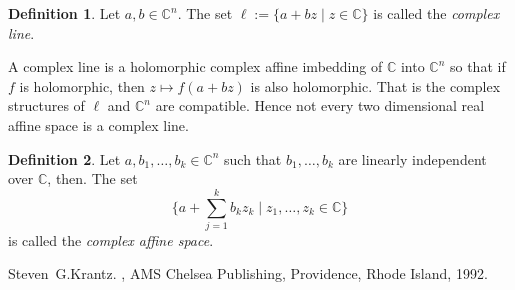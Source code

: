 \documentclass[12pt]{article}
\theoremstyle{theorem}
\theoremstyle{definition}
\newtheorem*{defn}{Definition}
\begin{document}
\begin{defn}
Let $a, b \in {\mathbb{C}}^n$.  The set
$\ell := \{a + b z \mid z \in {\mathbb{C}} \}$ is called the {\em complex line}.
\end{defn}

A complex line is a holomorphic complex affine imbedding of ${\mathbb{C}}$
into ${\mathbb{C}}^n$ so that if $f$ is holomorphic, then
$z \mapsto f(a + b z)$ is also holomorphic.  That is the complex structures of $\ell$ and ${\mathbb{C}}^n$ are compatible.  Hence not every two dimensional real affine space is a complex line.

\begin{defn}
Let $a, b_1, \ldots, b_k \in {\mathbb{C}}^n$ such that
$b_1, \ldots, b_k$ are linearly independent 
over ${\mathbb{C}}$,
then.  The set
\begin{equation*}
\{a + \sum_{j=1}^k b_k z_k \mid z_1,\ldots,z_k \in {\mathbb{C}} \}
\end{equation*}
is called the {\em complex affine space}.
\end{defn}

\begin{thebibliography}{9}
Steven~G.\@ Krantz.
{\em {}},
AMS Chelsea Publishing, Providence, Rhode Island, 1992.
\end{thebibliography}
\end{document}
